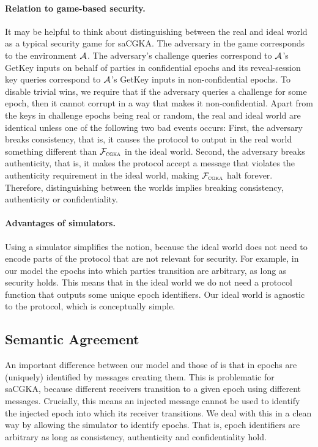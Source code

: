 \paragraph{Relation to game-based security.}
It may be helpful to think about distinguishing between the real and ideal world as a typical security game for saCGKA. The adversary in the game corresponds to the environment $\mathcal{A}_{\relax}$. The adversary's challenge queries correspond to $\mathcal{A}_{\relax}$'s GetKey inputs on behalf of parties in confidential epochs and its reveal-session key queries correspond to $\mathcal{A}_{\relax}$'s GetKey inputs in non-confidential epochs. To disable trivial wins, we require that if the adversary queries a challenge for some epoch, then it cannot corrupt in a way that makes it non-confidential.
%
Apart from the keys in challenge epochs being real or random, the real and ideal world are identical unless one of the following two bad events occurs: First, the adversary breaks consistency, that is, it causes the protocol to output in the real world something different than $\mathcal{F}_{\normalfont\textsc{cgka}}$ in the ideal world. Second, the adversary breaks authenticity, that is, it makes the protocol accept a message that violates the authenticity requirement in the ideal world, making $\mathcal{F}_{\normalfont\textsc{cgka}}$ halt forever. Therefore, distinguishing between the worlds implies breaking consistency, authenticity or confidentiality.

\paragraph{Advantages of simulators.}
Using a simulator simplifies the notion, because the ideal world does not
need to encode parts of the protocol that are not relevant for security. For
example, in our model the epochs into which parties transition are arbitrary,
as long as security holds. This means that in the ideal world we do not need
a protocol function that outputs some unique epoch identifiers. Our ideal world is agnostic to the protocol, which is conceptually simple.

\subsection{Semantic Agreement}
An important difference between our model and those of \cite{TCC:ACJM20,EPRINT:AlwJosMul20,hashimoto2021cmpke} is that in \cite{TCC:ACJM20,EPRINT:AlwJosMul20,hashimoto2021cmpke} epochs are (uniquely) identified by messages creating them. This is problematic for saCGKA, because different receivers transition to a given epoch using different messages. Crucially, this means an injected message cannot be used to identify the injected epoch into which its receiver transitions.
We deal with this in a clean way by allowing the simulator to identify epochs. That is, epoch identifiers are arbitrary as long as consistency, authenticity and confidentiality hold.

